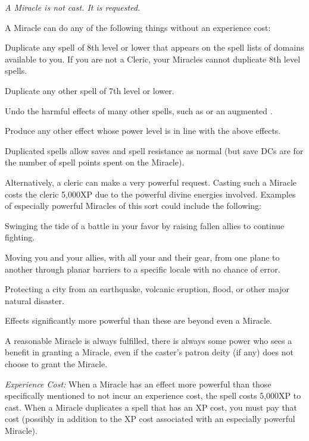 \emph{A Miracle is not cast. It is requested.}

A Miracle can do any of the following things without an experience cost:
\begin{list}{}{\leftmargin=1em}
  \item Duplicate any spell of 8th level or lower that appears on the spell lists of domains available to you.
  If you are not a Cleric, your Miracles cannot duplicate 8th level spells.
  \item Duplicate any other spell of 7th level or lower.
  \item Undo the harmful effects of many other spells, such as  or an augmented .
  \item Produce any other effect whose power level is in line with the above effects.
\end{list}
Duplicated spells allow saves and spell resistance as normal (but save DCs are for the number of spell points spent on the Miracle).

Alternatively, a cleric can make a very powerful request. 
Casting such a Miracle costs the cleric 5,000XP due to the powerful divine energies involved. 
Examples of especially powerful Miracles of this sort could include the following:
\begin{list}{}{\leftmargin=1em}
  \item Swinging the tide of a battle in your favor by raising fallen allies to continue fighting.
  \item Moving you and your allies, with all your and their gear, from one plane to another through planar barriers to a specific locale with no chance of error.
  \item Protecting a city from an earthquake, volcanic eruption, flood, or other major natural disaster.
\end{list}
Effects significantly more powerful than these are beyond even a Miracle.

A reasonable Miracle is always fulfilled, there is always some power who sees a benefit in granting a Miracle,
even if the caster's patron deity (if any) does not choose to grant the Miracle.

\emph{Experience Cost:} 
When a Miracle has an effect more powerful than those specifically mentioned to not incur an experience cost, the spell costs 5,000XP to cast.
When a Miracle duplicates a spell that has an XP cost, you must pay that cost (possibly in addition to the XP cost associated with an especially powerful Miracle).
